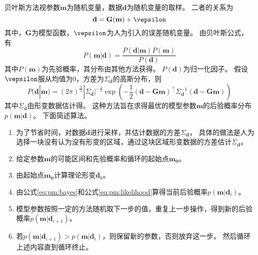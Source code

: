 贝叶斯方法视参数$\mathbf{m}$为随机变量，数据$\mathbf{d}$为随机变量的取样。
二者的关系为
\begin{equation}
    \mathbf{d}=\mathbf{G}(\mathbf{m})+\vepsilon
\end{equation}
其中，$\mathbf{G}$为模型函数，$\vepsilon$为人为引入的误差随机变量。
由贝叶斯公式，有
\begin{equation}
    \label{eq:pm:bayes}
    P(\mathbf{m}|\mathbf{d})=\frac{P(\mathbf{d}|\mathbf{m})P(\mathbf{m})}{P(\mathbf{d})}
\end{equation}
其中$P(\mathbf{m})$为先验概率，其分布由其他方法获得。
$P(\mathbf{d})$为归一化因子。
假设$\vepsilon$服从均值为$0$，方差为$\Sigma_{\mathbf{d}}$的高斯分布，则
\begin{equation}
    \label{eq:pm:likelihood}
    P(\mathbf{d}|\mathbf{m})=(2\pi)^{\frac{N}{2}}|\Sigma_{\mathbf{d}}|^{-\frac{1}{2}}
    \exp\left(-\frac{1}{2}(\mathbf{d-Gm})^{\top}\Sigma_{\mathbf{d}}^{-1}(\mathbf{d-Gm})\right)
\end{equation}
其中$\Sigma_{\mathbf{d}}$由形变数据估计得。
这种方法旨在求得最优的模型参数$\mathbf{m}$的后验概率分布$p(\mathbf{m}|\mathbf{d})$。
下面简述算法。
\begin{enumerate}
    \item 为了节省时间，对数据$\mathbf{d}$进行采样，并估计数据的方差$\Sigma_{\mathbf{d}}$，
    具体的做法是人为选择一块没有认为没有形变的区域，通过这块区域形变数据的方差估计$\Sigma_{\mathbf{d}}$。
    \item 给定参数$\mathbf{m}$的可能区间和先验概率和循环的起始点$\mathbf{m_0}$。
    \item 由起始点$\mathbf{m_0}$计算理论形变$\mathbf{d}_0$。
    \item 由公式\ref{eq:pm:bayes}和公式\ref{eq:pm:likelihood}算得当前后验概率$p(\mathbf{m}|\mathbf{d}_i)$。
    \item 模型参数按照一定的方法随机取下一步的值，重复上一步操作，得到新的后验概率$p(\mathbf{m}|\mathbf{d}_{i+1})$。
    \item 若$p(\mathbf{m}|\mathbf{d}_{i+1})>p(\mathbf{m}|\mathbf{d}_i)$，则保留新的参数，否则放弃这一步。
          然后循环上述内容直到循环终止。
\end{enumerate}
